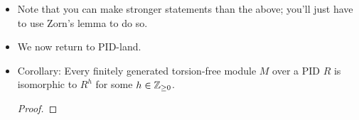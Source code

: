 \documentclass[../notes.tex]{subfiles}
\begin{document}
\begin{itemize}
\begin{enumerate}[label={(\roman*)}]
\begin{proof}
            \begin{equation*}
                a_1u_1+\cdots+a_hu_h+a_{h+1}w = 0
            \end{equation*}
            If $a_{h+1}=0$, then $(a_1,\dots,a_h)\neq 0$ makes $a_1u_1+\cdots+a_hu_h=0$, contradicting the assumed linear independence of $T$. Thus, $a_{h+1}\neq 0$. It follows that
            \begin{equation*}
                a_{h+1}w = -\sum_{i=1}^ha_iu_i \in M'
            \end{equation*}
            We may repeat this process for any $w\in S-T$ to obtain a nonzero $a_w$ such that $a_ww\in M'$. Additionally, if $w\in T$, take $a_w=1$. Now define
            \begin{equation*}
                a = \prod_{w\in S}a_w
            \end{equation*}
            Since $R$ is an integral domain by hypothesis and each $a_w$ in the above product is nonzero, $a$ is nonzero. Moreover, by its construction, $aw\in M'$ for all $w\in S$. Therefore,
            \begin{equation*}
                aM = a\left( \sum_{s\in S}As \right)
                \subset M'
            \end{equation*}
            as desired.
        \end{proof}
    \end{enumerate}
    \item Note that you can make stronger statements than the above; you'll just have to use Zorn's lemma to do so.
    \item We now return to PID-land.
    \item Corollary: Every finitely generated torsion-free module $M$ over a PID $R$ is isomorphic to $R^h$ for some $h\in{\mathbb{Z}_{\geq 0}}$.
    \begin{proof}


\end{proof}
\end{itemize}
\end{document}
